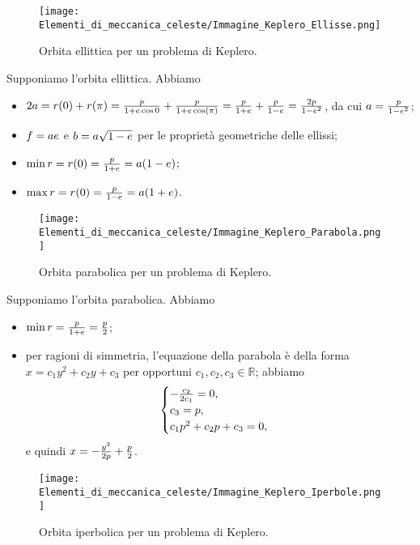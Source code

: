 \begin{figure}
	\texttt{[image: Elementi\_di\_meccanica\_celeste/Immagine\_Keplero\_Ellisse.png]}
	\centering
	\caption{Orbita ellittica per un problema di Keplero.}
\end{figure}
\Proof Supponiamo l'orbita ellittica. Abbiamo
\begin{itemize}
	\item $2 a = r(0) + r(\pi) = \frac{p}{1 + e \cos{0}} + \frac{p}{1 + e \cos(\pi)} = \frac{p}{1 + e} + \frac{p}{1 - e} = \frac{2 p}{1 - e^2}$, da cui $a = \frac{p}{1 - e^2}$;
	\item $f = a e$ e $b = a \sqrt{1 - e}$ per le propriet\`a geometriche delle ellissi;
	\item $\min r = r(0) = \frac{p}{1 + e} = a (1 - e)$;
	\item $\max r = r(0) = \frac{p}{1 - e} = a (1 + e)$.
\end{itemize}
\begin{figure}
	\texttt{[image: Elementi\_di\_meccanica\_celeste/Immagine\_Keplero\_Parabola.png]}
	\centering
	\caption{Orbita parabolica per un problema di Keplero.}
\end{figure}
\par Supponiamo l'orbita parabolica. Abbiamo
\begin{itemize}
	\item $\min r = \frac{p}{1 + e} = \frac{p}{2}$;
	\item per ragioni di simmetria, l'equazione della parabola \`e della forma $x = c_1y^2 + c_2y + c_3$ per opportuni $c_1, c_2, c_3 \in \mathbb{R}$; abbiamo
\[
\begin{cases}
	- \frac{c_2}{2 c_1} = 0,\\
	c_3 = p,\\
	c_1 p^2 + c_2 p + c_3 = 0,\\
\end{cases}
\]
	e quindi $x = -\frac{y^2}{2 p} + \frac{p}{2}$.
\end{itemize}
\begin{figure}
	\label{ElementiDiMeccanicaCeleste_Keplero_Iperbole}
	\texttt{[image: Elementi\_di\_meccanica\_celeste/Immagine\_Keplero\_Iperbole.png]}
	\centering
	\caption{Orbita iperbolica per un problema di Keplero.}
\end{figure}
